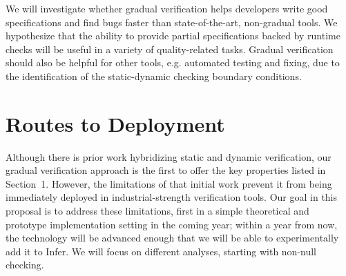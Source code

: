 \documentclass[10pt,twocolumn]{article}
\begin{document}
\begin{sloppypar}
We will investigate whether gradual verification helps developers write good specifications and find bugs faster than state-of-the-art, non-gradual tools.
We hypothesize that the ability to provide partial specifications backed by runtime checks will be useful in a variety of quality-related tasks.
Gradual verification should also be helpful for other tools, e.g. automated testing and fixing, due to the identification of the static-dynamic checking boundary conditions.

\section{Routes to Deployment}
\vspace{-2ex}

Although there is prior work hybridizing static and dynamic verification, 
our gradual verification approach is the first to offer the key properties listed in Section~1. However, the limitations of that initial work prevent it from being immediately deployed in industrial-strength verification tools.  Our goal in this proposal is to address these limitations, first in a simple theoretical and prototype implementation setting in the coming year; within a year from now, the technology will be advanced enough that we will be able to experimentally add it to Infer. We will focus on different analyses, starting with non-null checking.


\end{sloppypar}
\end{document}
